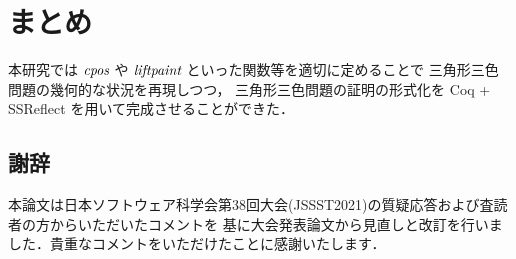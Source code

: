 \section{まとめ}
本研究では $\textit{cpos}$ や $\textit{liftpaint}$ といった関数等を適切に定めることで
三角形三色問題の幾何的な状況を再現しつつ，
三角形三色問題の証明の形式化を Coq + SSReflect を用いて完成させることができた．

\subsection*{謝辞}
本論文は日本ソフトウェア科学会第38回大会(JSSST2021)の質疑応答および査読者の方からいただいたコメントを
基に大会発表論文から見直しと改訂を行いました．貴重なコメントをいただけたことに感謝いたします．

